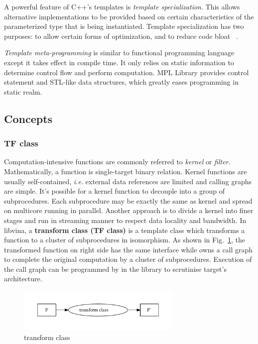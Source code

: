 \documentclass[10pt, conference, compsocconf]{IEEEtran}
\begin{document}
A powerful feature of C++'s templates is \emph{template specialization}. This allows alternative implementations to be provided based on certain characteristics of the parameterized type that is being instantiated. Template specialization has two purposes: to allow certain forms of optimization, and to reduce code bloat ~\cite{b18}.

\emph{Template meta-programming} is similar to functional programming language except it takes effect in compile time. It only relies on static information to determine control flow and perform computation. MPL Library \cite{b16} provides control statement and STL-like data structures, which greatly eases programming in static realm.

\subsection{Concepts}
\subsubsection{TF class}
Computation-intensive functions are commonly referred to \emph{kernel} or \emph{filter}. Mathematically, a function is single-target binary relation. Kernel functions are usually self-contained, \textit{i.e.} external data references are limited and calling graphs are simple. It's possible for a kernel function to decouple into a group of subprocedures. Each subprocedure may be exactly the same as kernel and spread on multicore running in parallel.  Another approach is to divide a kernel into finer stages and run in streaming manner to respect data locality and bandwidth. In libvina, a \textbf{transform class (TF class)} is a template class which transforms a function to a cluster of subprocedures in isomorphism. As shown in Fig.~\ref{fig:tfcls}, the transformed function on right side has the same interface while owns a call graph to complete the original computation by a cluster of subprocedures. Execution of the call graph can be programmed by in the library to scrutinise target's architecture.

\begin{figure}
\centering
\includegraphics[width=3.1in]{map-class}
\caption{transform class}\label{fig:tfcls}
\end{figure}
\end{document}

